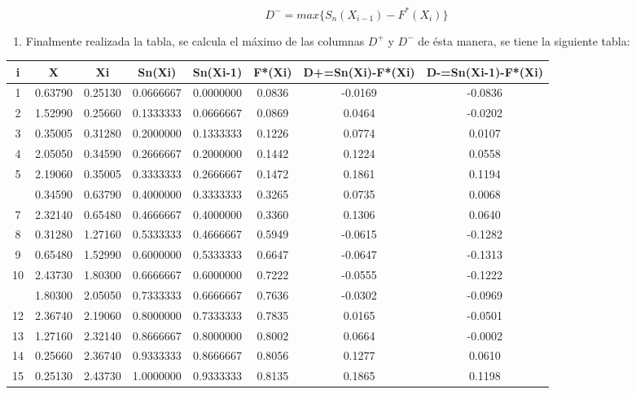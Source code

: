 \documentclass[a4paper,oneside,openany]{book}
\providecommand{\tightlist}{%
  \setlength{\itemsep}{0pt}\setlength{\parskip}{0pt}}
\begin{document}
\[D^-= max \{ S_{n}(X_{i-1})-F^*(X_{i})\}\]

\begin{enumerate}
\def\labelenumi{\arabic{enumi})}
\setcounter{enumi}{6}
\tightlist
\item
  Finalmente realizada la tabla, se calcula el máximo de las columnas
  \(D^+\) y \(D^-\) de ésta manera, se tiene la siguiente tabla:
\end{enumerate}

\begin{table}[H]
\centering
\begin{tabular}{cccccccc}
\toprule
i & X & Xi & Sn(Xi) & Sn(Xi-1) & F*(Xi) & D+=Sn(Xi)-F*(Xi) & D-=Sn(Xi-1)-F*(Xi)\\
\midrule
1 & 0.63790 & 0.25130 & 0.0666667 & 0.0000000 & 0.0836 & -0.0169 & -0.0836\\
2 & 1.52990 & 0.25660 & 0.1333333 & 0.0666667 & 0.0869 & 0.0464 & -0.0202\\
3 & 0.35005 & 0.31280 & 0.2000000 & 0.1333333 & 0.1226 & 0.0774 & 0.0107\\
4 & 2.05050 & 0.34590 & 0.2666667 & 0.2000000 & 0.1442 & 0.1224 & 0.0558\\
5 & 2.19060 & 0.35005 & 0.3333333 & 0.2666667 & 0.1472 & 0.1861 & 0.1194\\
\addlinespace
6 & 0.34590 & 0.63790 & 0.4000000 & 0.3333333 & 0.3265 & 0.0735 & 0.0068\\
7 & 2.32140 & 0.65480 & 0.4666667 & 0.4000000 & 0.3360 & 0.1306 & 0.0640\\
8 & 0.31280 & 1.27160 & 0.5333333 & 0.4666667 & 0.5949 & -0.0615 & -0.1282\\
9 & 0.65480 & 1.52990 & 0.6000000 & 0.5333333 & 0.6647 & -0.0647 & -0.1313\\
10 & 2.43730 & 1.80300 & 0.6666667 & 0.6000000 & 0.7222 & -0.0555 & -0.1222\\
\addlinespace
11 & 1.80300 & 2.05050 & 0.7333333 & 0.6666667 & 0.7636 & -0.0302 & -0.0969\\
12 & 2.36740 & 2.19060 & 0.8000000 & 0.7333333 & 0.7835 & 0.0165 & -0.0501\\
13 & 1.27160 & 2.32140 & 0.8666667 & 0.8000000 & 0.8002 & 0.0664 & -0.0002\\
14 & 0.25660 & 2.36740 & 0.9333333 & 0.8666667 & 0.8056 & 0.1277 & 0.0610\\
15 & 0.25130 & 2.43730 & 1.0000000 & 0.9333333 & 0.8135 & 0.1865 & 0.1198\\
\bottomrule
\end{tabular}
\end{table}
\end{document}
